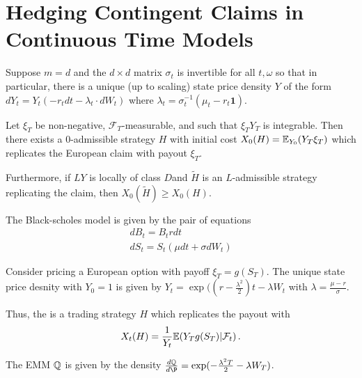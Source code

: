 \section{Hedging Contingent Claims in Continuous Time Models}
\label{sec:hedg-cont-claims}

\begin{thm}
  \label{sec:hedg-cont-claims-1}
  Suppose $m=d$ and the $d \times d$ matrix $\sigma_{t}$ is invertible
  for all $t, \omega$ so that in particular, there is a unique (up to
  scaling) state price density $Y$ of the form $dY_{t} = Y_{t}(-r_{t}
  dt - \lambda_{t} \cdot dW_{t})$ where $\lambda_{t} =
  \sigma_{t}^{-1}(\mu_{t} - r_{t} \mathbf{1})$.

  Let $\xi_{T}$ be non-negative, $\mathcal{F}_{T}$-measurable, and
  such that $\xi_{T} Y_{T}$ is integrable.  Then there exists a
  $0$-admissible strategy $H$ with initial cost $X_{0}(H) = \E{Y_{T}
    \xi_{T}}{Y_{0}}$ which replicates the European claim with payout
  $\xi_{T}$.

  Furthermore, if $LY$ is locally of class $D$and $\tilde H$ is an
  $L$-admissible strategy replicating the claim, then $X_{0}(\tilde H)
  \geq X_{0}(H)$.
\end{thm}

\begin{defn}
  \label{sec:hedg-cont-claims-2}
  The Black-scholes model is given by the pair of equations
  \begin{align}
    \label{eq:24}
    dB_{t} = B_{t} r dt \\
    dS_{t} = S_{t}(\mu dt + \sigma dW_{t})
  \end{align}

  Consider pricing a European option with payoff $\xi_{T} = g(S_{T})$.
  The unique state price desnity with $Y_{0} = 1$ is given by $Y_{t} =
  \exp((r - \frac{\lambda^{2}}{2})t - \lambda W_{t}$ with $\lambda =
  \frac{\mu - r}{\sigma}$.


  Thus, the is a trading strategy $H$ which replicates the payout with
  \begin{align}
    \label{eq:25}
    X_{t}(H) = \frac{1}{Y_{t}} \E{Y_{T} g(S_{T}) | \mathcal{F}_{t}}.
  \end{align}

  The EMM $\Q$ is given by the density $\frac{d\Q}{d\P} =
  \exp(-\frac{\lambda^{2} T}{2} - \lambda W_{T})$.
\end{defn}

